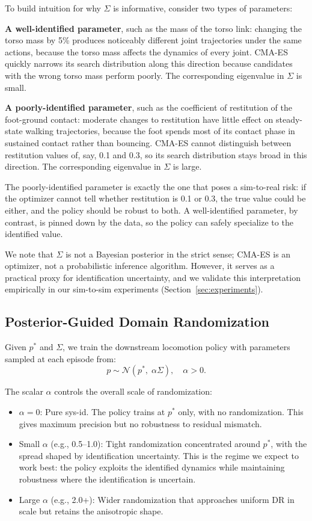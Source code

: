 \documentclass[10pt,twocolumn]{article}
\begin{document}
To build intuition for why $\Sigma$ is informative, consider two types of parameters:

\textbf{A well-identified parameter}, such as the mass of the torso link: changing the torso mass by 5\% produces noticeably different joint trajectories under the same actions, because the torso mass affects the dynamics of every joint.
CMA-ES quickly narrows its search distribution along this direction because candidates with the wrong torso mass perform poorly.
The corresponding eigenvalue in $\Sigma$ is small.

\textbf{A poorly-identified parameter}, such as the coefficient of restitution of the foot-ground contact: moderate changes to restitution have little effect on steady-state walking trajectories, because the foot spends most of its contact phase in sustained contact rather than bouncing.
CMA-ES cannot distinguish between restitution values of, say, 0.1 and 0.3, so its search distribution stays broad in this direction.
The corresponding eigenvalue in $\Sigma$ is large.

The poorly-identified parameter is exactly the one that poses a sim-to-real risk: if the optimizer cannot tell whether restitution is 0.1 or 0.3, the true value could be either, and the policy should be robust to both.
A well-identified parameter, by contrast, is pinned down by the data, so the policy can safely specialize to the identified value.

We note that $\Sigma$ is not a Bayesian posterior in the strict sense; CMA-ES is an optimizer, not a probabilistic inference algorithm.
However, it serves as a practical proxy for identification uncertainty, and we validate this interpretation empirically in our sim-to-sim experiments (Section~\ref{sec:experiments}).

\subsection{Posterior-Guided Domain Randomization}

Given $p^*$ and $\Sigma$, we train the downstream locomotion policy with parameters sampled at each episode from:
\begin{equation}
    p \sim \mathcal{N}(p^*, \; \alpha \Sigma), \quad \alpha > 0.
    \label{eq:pgdr}
\end{equation}

The scalar $\alpha$ controls the overall scale of randomization:
\begin{itemize}
    \item $\alpha = 0$: Pure sys-id.  The policy trains at $p^*$ only, with no randomization.  This gives maximum precision but no robustness to residual mismatch.
    \item Small $\alpha$ (e.g., 0.5--1.0): Tight randomization concentrated around $p^*$, with the spread shaped by identification uncertainty.  This is the regime we expect to work best: the policy exploits the identified dynamics while maintaining robustness where the identification is uncertain.
    \item Large $\alpha$ (e.g., 2.0+): Wider randomization that approaches uniform DR in scale but retains the anisotropic shape.
\end{itemize}
\end{document}
